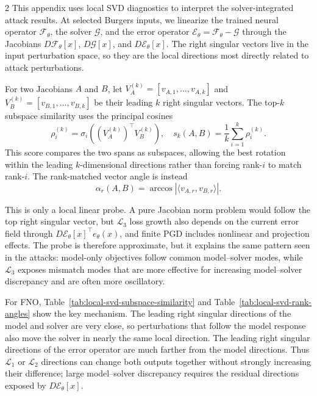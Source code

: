 ﻿\documentclass[letterpaper]{article} %
\newcommand{\tabref}[1]{Table~\ref{#1}}
\begin{document}
\begin{multicols}{2}
This appendix uses local SVD diagnostics to interpret the solver-integrated
attack results. At selected Burgers inputs, we linearize the trained neural
operator $\mathcal{F}_\theta$, the solver $\mathcal{G}$, and the error operator
$\mathcal{E}_\theta=\mathcal{F}_\theta-\mathcal{G}$ through the Jacobians
$D\mathcal{F}_\theta[x]$, $D\mathcal{G}[x]$, and
$D\mathcal{E}_\theta[x]$. The right singular vectors live in the input
perturbation space, so they are the local directions most directly related to
attack perturbations.

For two Jacobians $A$ and $B$, let
$V_A^{(k)}=[v_{A,1},\ldots,v_{A,k}]$ and
$V_B^{(k)}=[v_{B,1},\ldots,v_{B,k}]$ be their leading $k$ right singular
vectors. The top-$k$ subspace similarity uses the principal cosines
\begin{equation*}
  \rho_i^{(k)}
  =
  \sigma_i\!\left((V_A^{(k)})^\top V_B^{(k)}\right),
  \quad
  s_k(A,B)=\frac{1}{k}\sum_{i=1}^k \rho_i^{(k)} .
\end{equation*}
This score compares the two spans as subspaces, allowing the best rotation
within the leading $k$-dimensional directions rather than forcing rank-$i$ to
match rank-$i$. The rank-matched vector angle is instead
\begin{equation*}
  \alpha_r(A,B)
  =
  \arccos |\langle v_{A,r},v_{B,r}\rangle| .
\end{equation*}

This is only a local linear probe. A pure Jacobian norm problem would
follow the top right singular vector, but $\mathcal{L}_3$ loss growth also
depends on the current error field through
$D\mathcal{E}_\theta[x]^\top e_\theta(x)$, and finite PGD includes nonlinear
and projection effects. The probe is therefore approximate, but it explains
the same pattern seen in the attacks: model-only objectives follow common
model--solver modes, while $\mathcal{L}_3$ exposes mismatch modes that are more
effective for increasing model--solver discrepancy and are often more
oscillatory.

For FNO, \tabref{tab:local-svd-subspace-similarity} and
\tabref{tab:local-svd-rank-angles} show the key mechanism. The leading right
singular directions of the model and solver are very close, so perturbations
that follow the model response also move the solver in nearly the same local
direction. The leading right singular directions of the error operator are
much farther from the model directions. Thus $\mathcal{L}_1$ or $\mathcal{L}_2$ directions
can change both outputs together without strongly increasing their difference;
large model--solver discrepancy requires the residual directions exposed by
$D\mathcal{E}_\theta[x]$.
\end{multicols}
\end{document}
